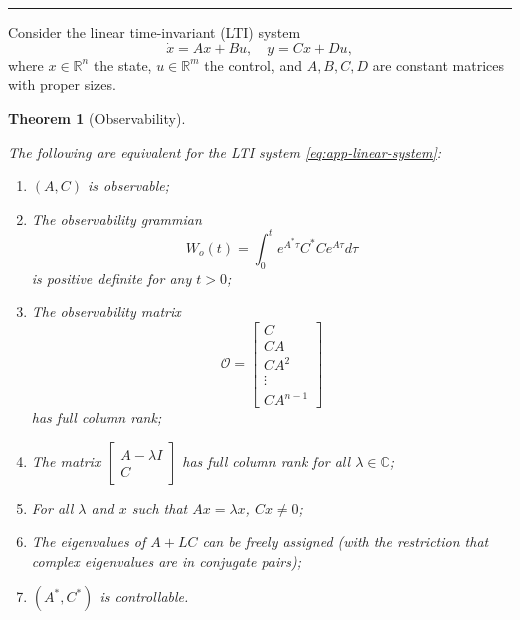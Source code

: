 \documentclass[
]{book}
\newtheorem{theorem}{Theorem}[chapter]
\theoremstyle{definition}
\theoremstyle{definition}
\theoremstyle{definition}
\theoremstyle{definition}
\theoremstyle{remark}
\begin{document}
\begin{center}\rule{0.5\linewidth}{0.5pt}\end{center}

Consider the linear time-invariant (LTI) system
\begin{equation}
\dot{x} = A x + B u, \quad y = C x + D u,
\label{eq:app-linear-system}
\end{equation}
where \(x \in \mathbb{R}^n\) the state, \(u \in \mathbb{R}^m\) the control, and \(A,B,C,D\) are constant matrices with proper sizes.

\begin{theorem}[Observability]
\protect\hypertarget{thm:ltiobservable}{}\label{thm:ltiobservable}

The following are equivalent for the LTI system \eqref{eq:app-linear-system}:

\begin{enumerate}
\def\labelenumi{\arabic{enumi}.}
\item
  \((A,C)\) is observable;
\item
  The observability grammian
  \[
  W_o (t) = \int_{0}^t e^{A^* \tau} C^* C e^{A\tau} d\tau
  \]
  is positive definite for any \(t > 0\);
\item
  The observability matrix
  \[
  \mathcal{O} = \begin{bmatrix} C \\ CA \\ CA^2 \\ \vdots \\ C A^{n-1} \end{bmatrix}
  \]
  has full column rank;
\item
  The matrix \(\begin{bmatrix} A - \lambda I \\ C \end{bmatrix}\) has full column rank for all \(\lambda \in \mathbb{C}\);
\item
  For all \(\lambda\) and \(x\) such that \(Ax = \lambda x\), \(Cx \neq 0\);
\item
  The eigenvalues of \(A + LC\) can be freely assigned (with the restriction that complex eigenvalues are in conjugate pairs);
\item
  \((A^*,C^*)\) is controllable.
\end{enumerate}

\end{theorem}
\end{document}
